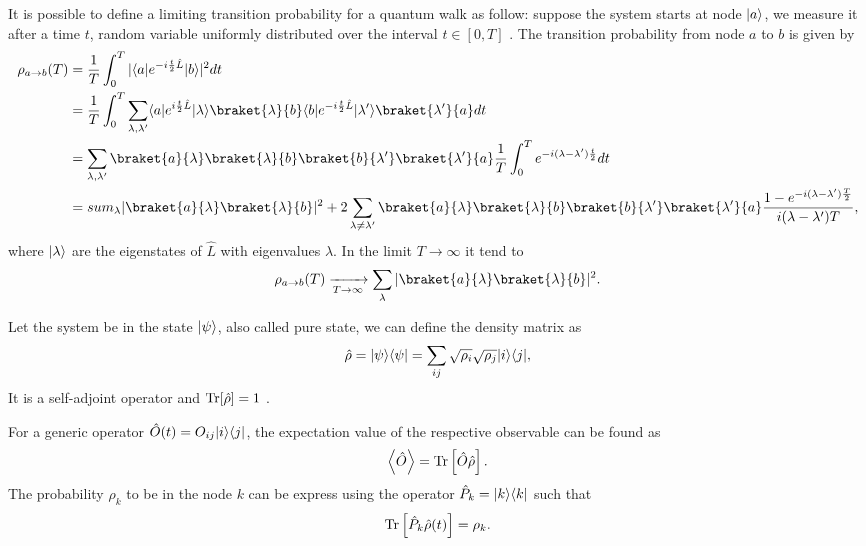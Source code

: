 It is possible to define a limiting transition probability for a quantum walk as follow: suppose the system starts at node $\lvert a\rangle$, we measure it after a time $t$, random variable uniformly distributed over the interval $t \in [0,T]$ \cite{quantum_walk}. The transition probability from node $a$ to $b$ is given by
\begin{equation}
    \begin{split}
        \rho_{a\rightarrow b}(T) &= \frac{1}{T}\int_0^T |\bra{a}e^{-i\frac{t}{2}\hat L} \ket{b}|^2 dt\\
        &=\frac{1}{T}\int_0^T \sum_{\lambda,\lambda'}\bra{a}e^{i\frac{t}{2}\hat L}\ket{\lambda}\braket{\lambda}{b} \bra{b}e^{-i\frac{t}{2}\hat L} \ket{\lambda'}\braket{\lambda'}{a} dt\\
        &= \sum_{\lambda,\lambda'}\braket{a}{\lambda}\braket{\lambda}{b}\braket{b}{\lambda'}\braket{\lambda'}{a}\frac{1}{T}\int_0^T e^{-i(\lambda-\lambda')\frac{t}{2}}dt\\
        &= sum_\lambda|\braket{a}{\lambda}\braket{\lambda}{b}|^2+2\sum_{\lambda\neq\lambda'}\braket{a}{\lambda}\braket{\lambda}{b}\braket{b}{\lambda'}\braket{\lambda'}{a}\frac{1-e^{-i(\lambda-\lambda')\frac{T}{2}}}{i(\lambda-\lambda')T},\\
    \end{split}
\end{equation}
where $\lvert\lambda\rangle$ are the eigenstates of $\hat L$ with eigenvalues $\lambda$. In the limit $T\rightarrow \infty$ it tend to 
\begin{equation}
    \rho_{a\rightarrow b}(T) \xrightarrow[T \rightarrow \infty]{} \sum_\lambda|\braket{a}{\lambda}\braket{\lambda}{b}|^2.
\end{equation}

Let the system be in the state $\lvert\psi\rangle$, also called pure state, we can define the density matrix as
\begin{equation}
    \hat\rho =\lvert\psi\rangle\langle\psi\rvert = \sum_{ij} \sqrt{\rho_i} \sqrt{\rho_j}\lvert i\rangle\langle j\rvert,
\end{equation}
It is a self-adjoint operator and $\operatorname{Tr}[\hat\rho] = 1$ \cite{Nielsen_Chuang_2010}.

For a generic operator $\hat O(t) = O_{ij}\lvert i\rangle\langle j\rvert$, the expectation value of the respective observable can be found as
\begin{equation}
        \left< \hat O\right> = \operatorname{Tr}\left[\hat O\hat\rho\right].
\end{equation}
The probability $\rho_k$ to be in the node $k$ can be express using the operator $\hat P_k = \lvert k\rangle\langle k\rvert$ such that
\begin{equation} \label{state_projection_quantum}
    \begin{split}
        \operatorname{Tr}\left[\hat P_k\hat\rho(t)\right] 
        = \rho_k.
    \end{split}
\end{equation}

